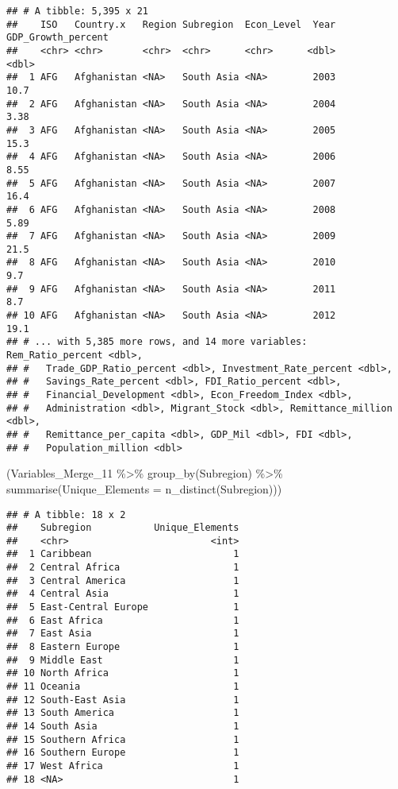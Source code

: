 \documentclass[
]{article}
\newenvironment{Shaded}{\begin{snugshade}}{\end{snugshade}}
\newcommand{\AttributeTok}[1]{\textcolor[rgb]{0.77,0.63,0.00}{#1}}
\newcommand{\FunctionTok}[1]{\textcolor[rgb]{0.00,0.00,0.00}{#1}}
\newcommand{\NormalTok}[1]{#1}
\newcommand{\SpecialCharTok}[1]{\textcolor[rgb]{0.00,0.00,0.00}{#1}}
\begin{document}
\begin{verbatim}
## # A tibble: 5,395 x 21
##    ISO   Country.x   Region Subregion  Econ_Level  Year GDP_Growth_percent
##    <chr> <chr>       <chr>  <chr>      <chr>      <dbl>              <dbl>
##  1 AFG   Afghanistan <NA>   South Asia <NA>        2003              10.7 
##  2 AFG   Afghanistan <NA>   South Asia <NA>        2004               3.38
##  3 AFG   Afghanistan <NA>   South Asia <NA>        2005              15.3 
##  4 AFG   Afghanistan <NA>   South Asia <NA>        2006               8.55
##  5 AFG   Afghanistan <NA>   South Asia <NA>        2007              16.4 
##  6 AFG   Afghanistan <NA>   South Asia <NA>        2008               5.89
##  7 AFG   Afghanistan <NA>   South Asia <NA>        2009              21.5 
##  8 AFG   Afghanistan <NA>   South Asia <NA>        2010               9.7 
##  9 AFG   Afghanistan <NA>   South Asia <NA>        2011               8.7 
## 10 AFG   Afghanistan <NA>   South Asia <NA>        2012              19.1 
## # ... with 5,385 more rows, and 14 more variables: Rem_Ratio_percent <dbl>,
## #   Trade_GDP_Ratio_percent <dbl>, Investment_Rate_percent <dbl>,
## #   Savings_Rate_percent <dbl>, FDI_Ratio_percent <dbl>,
## #   Financial_Development <dbl>, Econ_Freedom_Index <dbl>,
## #   Administration <dbl>, Migrant_Stock <dbl>, Remittance_million <dbl>,
## #   Remittance_per_capita <dbl>, GDP_Mil <dbl>, FDI <dbl>,
## #   Population_million <dbl>
\end{verbatim}

\begin{Shaded}
\begin{Highlighting}[]
\NormalTok{(Variables\_Merge\_11 }\SpecialCharTok{\%\textgreater{}\%}                   
  \FunctionTok{group\_by}\NormalTok{(Subregion) }\SpecialCharTok{\%\textgreater{}\%}          
  \FunctionTok{summarise}\NormalTok{(}\AttributeTok{Unique\_Elements =} \FunctionTok{n\_distinct}\NormalTok{(Subregion)))}
\end{Highlighting}
\end{Shaded}

\begin{verbatim}
## # A tibble: 18 x 2
##    Subregion           Unique_Elements
##    <chr>                         <int>
##  1 Caribbean                         1
##  2 Central Africa                    1
##  3 Central America                   1
##  4 Central Asia                      1
##  5 East-Central Europe               1
##  6 East Africa                       1
##  7 East Asia                         1
##  8 Eastern Europe                    1
##  9 Middle East                       1
## 10 North Africa                      1
## 11 Oceania                           1
## 12 South-East Asia                   1
## 13 South America                     1
## 14 South Asia                        1
## 15 Southern Africa                   1
## 16 Southern Europe                   1
## 17 West Africa                       1
## 18 <NA>                              1
\end{verbatim}
\end{document}
